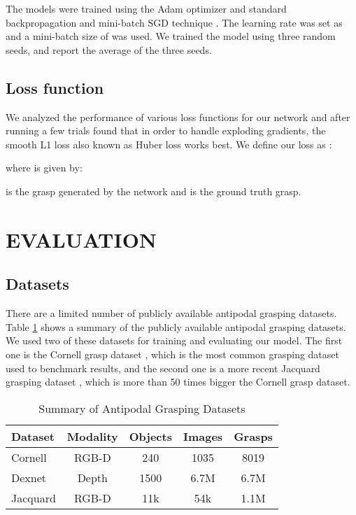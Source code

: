 \documentclass[letterpaper, 10 pt, conference]{ieeeconf}
\begin{document}
The models were trained using the Adam optimizer \cite{adam2015} and standard backpropagation and mini-batch SGD technique \cite{nitanda2014stochastic}. The learning rate was set as  and a mini-batch size of  was used. We trained the model using three random seeds, and report the average of the three seeds. 

\subsection{Loss function}
We analyzed the performance of various loss functions for our network and after running a few trials found that in order to handle exploding gradients, the smooth L1 loss also known as Huber loss works best. We define our loss as :

where  is given by:

 is the grasp generated by the network and  is the ground truth grasp.



\section{EVALUATION}

\subsection{Datasets}
There are a limited number of publicly available antipodal grasping datasets. Table \ref{tab:datasets} shows a summary of the publicly available antipodal grasping datasets. We used two of these datasets for training and evaluating our model. The first one is the Cornell grasp dataset \cite{jiang2011efficient}, which is the most common grasping dataset used to benchmark results, and the second one is a more recent Jacquard grasping dataset \cite{depierre2018jacquard}, which is more than 50 times bigger the Cornell grasp dataset.

\begin{table}[htbp]
\vspace{2mm}
\begin{center}
\caption{Summary of Antipodal Grasping Datasets}
\label{tab:datasets}
\begin{tabular}{l|c|c|c|c}
\hline
\textbf{Dataset} & \textbf{Modality} & \textbf{Objects} & \textbf{Images} & \textbf{Grasps} \\
\hline
Cornell & RGB-D & 240 & 1035 & 8019 \\
Dexnet & Depth & 1500 & 6.7M & 6.7M \\
Jacquard & RGB-D & 11k & 54k & 1.1M \\
\hline
\end{tabular}
\end{center}
\end{table}
\end{document}
